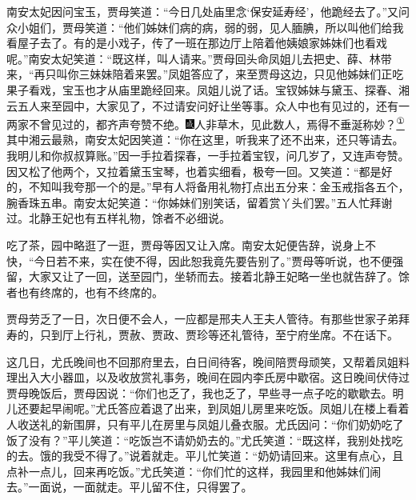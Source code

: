 南安太妃因问宝玉，贾母笑道：``今日几处庙里念`保安延寿经'，他跪经去了。''又问众小姐们，贾母笑道：``他们姊妹们病的病，弱的弱，见人腼腆，所以叫他们给我看屋子去了。有的是小戏子，传了一班在那边厅上陪着他姨娘家姊妹们也看戏呢。''南安太妃笑道：``既这样，叫人请来。''贾母回头命凤姐儿去把史、薛、林带来，``再只叫你三妹妹陪着来罢。''凤姐答应了，来至贾母这边，只见他姊妹们正吃果子看戏，宝玉也才从庙里跪经回来。凤姐儿说了话。宝钗姊妹与黛玉、探春、湘云五人来至园中，大家见了，不过请安问好让坐等事。众人中也有见过的，还有一两家不曾见过的，都齐声夸赞不绝。{\includegraphics[width=3mm]{../Images/00005}\kaishu 人非草木，见此数人，焉得不垂涎称妙？}\href{../Text/part0075_split_000.html\#lnkback_1_a}{\textsuperscript{①}}其中湘云最熟，南安太妃因笑道：``你在这里，听我来了还不出来，还只等请去。我明儿和你叔叔算账。''因一手拉着探春，一手拉着宝钗，问几岁了，又连声夸赞。因又松了他两个，又拉着黛玉宝琴，也着实细看，极夸一回。又笑道：``都是好的，不知叫我夸那一个的是。''早有人将备用礼物打点出五分来：金玉戒指各五个，腕香珠五串。南安太妃笑道：``你姊妹们别笑话，留着赏丫头们罢。''五人忙拜谢过。北静王妃也有五样礼物，馀者不必细说。

吃了茶，园中略逛了一逛，贾母等因又让入席。南安太妃便告辞，说身上不快，``今日若不来，实在使不得，因此恕我竟先要告别了。''贾母等听说，也不便强留，大家又让了一回，送至园门，坐轿而去。接着北静王妃略一坐也就告辞了。馀者也有终席的，也有不终席的。

贾母劳乏了一日，次日便不会人，一应都是邢夫人王夫人管待。有那些世家子弟拜寿的，只到厅上行礼，贾赦、贾政、贾珍等还礼管待，至宁府坐席。不在话下。

这几日，尤氏晚间也不回那府里去，白日间待客，晚间陪贾母顽笑，又帮着凤姐料理出入大小器皿，以及收放赏礼事务，晚间在园内李氏房中歇宿。这日晚间伏侍过贾母晚饭后，贾母因说：``你们也乏了，我也乏了，早些寻一点子吃的歇歇去。明儿还要起早闹呢。''尤氏答应着退了出来，到凤姐儿房里来吃饭。凤姐儿在楼上看着人收送礼的新围屏，只有平儿在房里与凤姐儿叠衣服。尤氏因问：``你们奶奶吃了饭了没有？''平儿笑道：``吃饭岂不请奶奶去的。''尤氏笑道：``既这样，我别处找吃的去。饿的我受不得了。''说着就走。平儿忙笑道：``奶奶请回来。这里有点心，且点补一点儿，回来再吃饭。''尤氏笑道：``你们忙的这样，我园里和他姊妹们闹去。''一面说，一面就走。平儿留不住，只得罢了。

